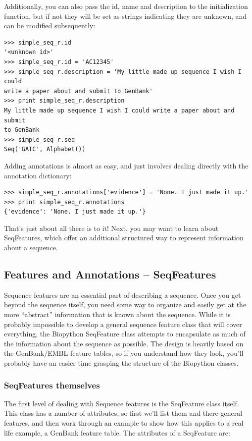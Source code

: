 \documentclass{report}
\begin{document}
Additionally, you can also pass the id, name and description to the initialization function, but if not they will be set as strings indicating they are unknown, and can be modified subsequently:

\begin{verbatim}
>>> simple_seq_r.id
'<unknown id>'
>>> simple_seq_r.id = 'AC12345'
>>> simple_seq_r.description = 'My little made up sequence I wish I could 
write a paper about and submit to GenBank'
>>> print simple_seq_r.description
My little made up sequence I wish I could write a paper about and submit 
to GenBank
>>> simple_seq_r.seq
Seq('GATC', Alphabet())
\end{verbatim}

Adding annotations is almost as easy, and just involves dealing directly with the annotation dictionary:

\begin{verbatim}
>>> simple_seq_r.annotations['evidence'] = 'None. I just made it up.'
>>> print simple_seq_r.annotations
{'evidence': 'None. I just made it up.'}
\end{verbatim}

That's just about all there is to it! Next, you may want to learn about SeqFeatures, which offer an additional structured way to represent information about a sequence.

\subsection{Features and Annotations -- SeqFeatures}
\label{sec:seq_features}

Sequence features are an essential part of describing a sequence. Once you get beyond the sequence itself, you need some way to organize and easily get at the more ``abstract'' information that is known about the sequence. While it is probably impossible to develop a general sequence feature class that will cover everything, the Biopython SeqFeature class attempts to encapsulate as much of the information about the sequence as possible. The design is heavily based on the GenBank/EMBL feature tables, so if you understand how they look, you'll probably have an easier time grasping the structure of the Biopython classes.

\subsubsection{SeqFeatures themselves}

The first level of dealing with Sequence features is the SeqFeature class itself. This class has a number of attributes, so first we'll list them and there general features, and then work through an example to show how this applies to a real life example, a GenBank feature table. The attributes of a SeqFeature are:
\end{document}

